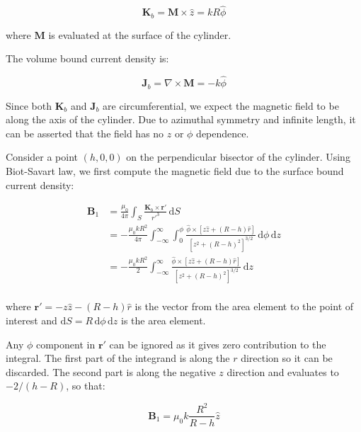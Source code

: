 \documentclass[12pt]{article}
\begin{document}
\begin{equation}
    \mathbf{K}_{b} = \mathbf{M} \times \hat{z} = kR \hat{\phi}
\end{equation}

where $\mathbf{M}$ is evaluated at the surface of the cylinder.

The volume bound current density is:

\begin{equation}
    \mathbf{J}_{b} = \nabla \times \mathbf{M} = -k \hat{\phi}
\end{equation}

Since both $\mathbf{K}_{b}$ and $\mathbf{J}_{b}$ are circumferential, we expect the magnetic field to be along the axis of the cylinder. Due to azimuthal symmetry and infinite length, it can be asserted that the field has no $z$ or $\phi$ dependence. 

Consider a point $(h, 0, 0)$ on the perpendicular bisector of the cylinder. Using Biot-Savart law, we first compute the magnetic field due to the surface bound current density:

\begin{equation}
\begin{split}
    \mathbf{B}_{1} &= \frac{\mu_{0}}{4\pi} \int_{S} \frac{\mathbf{K}_{b} \times \mathbf{r}'}{r'^{3}} \, \mathrm{d}S \\
    &= -\frac{\mu_{0}kR^{2}}{4\pi} \int_{-\infty}^{\infty} \int_{0}^{\phi} \frac{\hat{\phi} \times [z \hat{z} + (R-h) \hat{r}]}{[z^{2} + (R-h)^{2}]^{3/2}} \, \mathrm{d}\phi \, \mathrm{d}z \\
    &= -\frac{\mu_{0}kR^{2}}{2} \int_{-\infty}^{\infty} \frac{\hat{\phi} \times [z \hat{z} + (R-h) \hat{r}]}{[z^{2} + (R-h)^{2}]^{3/2}} \, \mathrm{d}z \\
\end{split}
\end{equation}

where $\mathbf{r}' = -z \hat{z} - (R-h) \hat{r}$ is the vector from the area element to the point of interest and $\mathrm{d}S = R \, \mathrm{d}\phi \, \mathrm{d}z$ is the area element.

Any $\phi$ component in $\mathbf{r}'$ can be ignored as it gives zero contribution to the integral. The first part of the integrand is along the $r$ direction so it can be discarded. The second part is along the negative $z$ direction and evaluates to $-2/(h-R)$, so that:

\begin{equation}
    \mathbf{B}_{1} = \mu_{0}k \frac{R^{2}}{R-h} \hat{z}
\end{equation}
\end{document}

